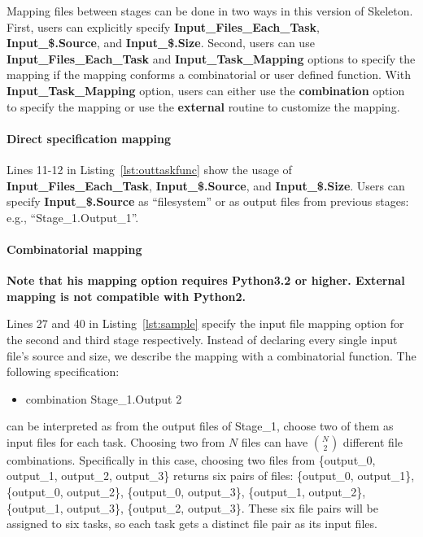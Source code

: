 \documentclass[10pt,a4paper]{article}
\begin{document}
Mapping files between stages can be done in two ways in this version of Skeleton.
First, users can explicitly specify \textbf{Input\_Files\_Each\_Task}, \textbf{Input\_\$.Source}, and \textbf{Input\_\$.Size}.
Second, users can use \textbf{Input\_Files\_Each\_Task} and \textbf{Input\_Task\_Mapping} options to specify the mapping if the mapping conforms a combinatorial or user defined function. 
With \textbf{Input\_Task\_Mapping} option, users can either use
the \textbf{combination} option to specify the mapping or use the \textbf{external} routine to customize the mapping. 

\paragraph{Direct specification mapping}

Lines 11-12 in Listing~\ref{lst:outtaskfunc} show the usage of \textbf{Input\_Files\_Each\_Task}, \textbf{Input\_\$.Source}, and \textbf{Input\_\$.Size}.
Users can specify \textbf{Input\_\$.Source} as ``filesystem'' or as output files from previous stages: e.g., ``Stage\_1.Output\_1''.

\paragraph{Combinatorial mapping}

\textbf{Note that his mapping option requires Python3.2 or higher. External mapping is not compatible with Python2.}

Lines 27 and 40 in Listing~\ref{lst:sample} specify the input file mapping option for the second and
third stage respectively. Instead of declaring every single input file's source and size, we describe
the mapping with a combinatorial function. The following specification:
\begin{itemize}
\item[] combination Stage\_1.Output 2
\end{itemize}
can be interpreted as from the output files of Stage\_1, choose two of them as input files for each task.
Choosing two from $N$ files can have $N \choose 2$ different file combinations. 
Specifically in this case, choosing two files from \{output\_0, output\_1, output\_2, output\_3\} returns six pairs of files: 
\{output\_0, output\_1\}, \{output\_0, output\_2\}, \{output\_0, output\_3\}, \{output\_1, output\_2\}, \{output\_1, output\_3\}, \{output\_2, output\_3\}.
These six file pairs will be assigned to six tasks, so each task gets a distinct file pair as its input files.
\end{document}
